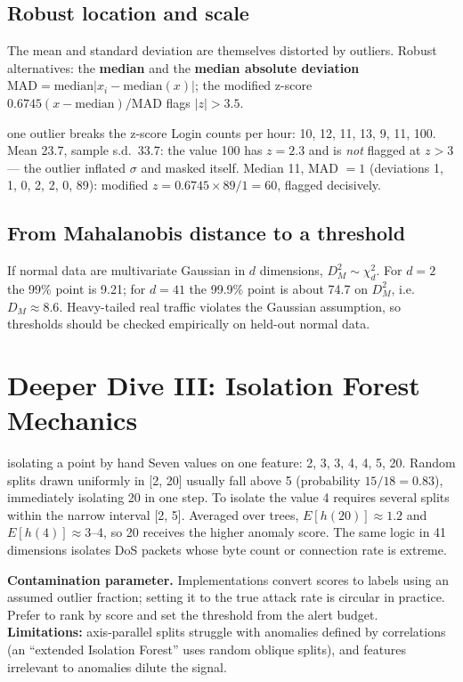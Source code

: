 \documentclass[11pt]{article}
\begin{document}
\subsection{Robust location and scale}
The mean and standard deviation are themselves distorted by outliers. Robust alternatives: the \textbf{median} and the \textbf{median absolute deviation} $\text{MAD}=\text{median}|x_i-\text{median}(x)|$; the modified z-score $0.6745(x-\text{median})/\text{MAD}$ flags $|z|>3.5$.
\begin{example}{one outlier breaks the z-score}
Login counts per hour: 10, 12, 11, 13, 9, 11, 100. Mean 23.7, sample s.d.\ 33.7: the value 100 has $z=2.3$ and is \emph{not} flagged at $z>3$ --- the outlier inflated $\sigma$ and masked itself. Median 11, MAD $=1$ (deviations 1, 1, 0, 2, 2, 0, 89): modified $z=0.6745\times89/1=60$, flagged decisively.
\end{example}

\subsection{From Mahalanobis distance to a threshold}
If normal data are multivariate Gaussian in $d$ dimensions, $D_M^2\sim\chi^2_d$. For $d=2$ the 99\% point is 9.21; for $d=41$ the 99.9\% point is about 74.7 on $D_M^2$, i.e.\ $D_M\approx8.6$. Heavy-tailed real traffic violates the Gaussian assumption, so thresholds should be checked empirically on held-out normal data.

\section{Deeper Dive III: Isolation Forest Mechanics}
\begin{example}{isolating a point by hand}
Seven values on one feature: 2, 3, 3, 4, 4, 5, 20. Random splits drawn uniformly in [2, 20] usually fall above 5 (probability $15/18=0.83$), immediately isolating 20 in one step. To isolate the value 4 requires several splits within the narrow interval [2, 5]. Averaged over trees, $E[h(20)]\approx1.2$ and $E[h(4)]\approx3$--4, so 20 receives the higher anomaly score. The same logic in 41 dimensions isolates DoS packets whose byte count or connection rate is extreme.
\end{example}
\textbf{Contamination parameter.} Implementations convert scores to labels using an assumed outlier fraction; setting it to the true attack rate is circular in practice. Prefer to rank by score and set the threshold from the alert budget. \textbf{Limitations:} axis-parallel splits struggle with anomalies defined by correlations (an ``extended Isolation Forest'' uses random oblique splits), and features irrelevant to anomalies dilute the signal.
\end{document}
